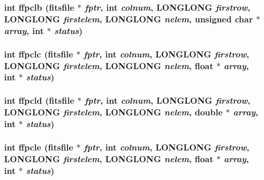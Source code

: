 \subsubsection{\setlength{\rightskip}{0pt plus 5cm}int ffpclb (\bf{fitsfile} $\ast$ {\em fptr}, int {\em colnum}, \bf{LONGLONG} {\em firstrow}, \bf{LONGLONG} {\em firstelem}, \bf{LONGLONG} {\em nelem}, unsigned char $\ast$ {\em array}, int $\ast$ {\em status})}\label{test_2shm__client_2fitsio_8h_292509f5a619292d087aaa3b8b40a621}


\subsubsection{\setlength{\rightskip}{0pt plus 5cm}int ffpclc (\bf{fitsfile} $\ast$ {\em fptr}, int {\em colnum}, \bf{LONGLONG} {\em firstrow}, \bf{LONGLONG} {\em firstelem}, \bf{LONGLONG} {\em nelem}, float $\ast$ {\em array}, int $\ast$ {\em status})}\label{test_2shm__client_2fitsio_8h_f28b5d35cf1bfba0826c8bac66ecf702}


\subsubsection{\setlength{\rightskip}{0pt plus 5cm}int ffpcld (\bf{fitsfile} $\ast$ {\em fptr}, int {\em colnum}, \bf{LONGLONG} {\em firstrow}, \bf{LONGLONG} {\em firstelem}, \bf{LONGLONG} {\em nelem}, double $\ast$ {\em array}, int $\ast$ {\em status})}\label{test_2shm__client_2fitsio_8h_19edb8890772979f20c6f6e5957b2ad1}


\subsubsection{\setlength{\rightskip}{0pt plus 5cm}int ffpcle (\bf{fitsfile} $\ast$ {\em fptr}, int {\em colnum}, \bf{LONGLONG} {\em firstrow}, \bf{LONGLONG} {\em firstelem}, \bf{LONGLONG} {\em nelem}, float $\ast$ {\em array}, int $\ast$ {\em status})}\label{test_2shm__client_2fitsio_8h_2af80b40c939d1d21b4da19e8999421c}


